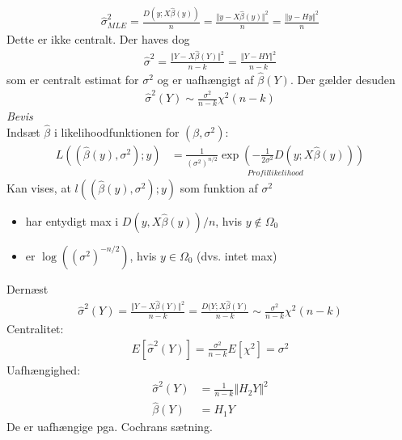 \documentclass[12pt,a4paper]{report}
\begin{document}
\begin{align*}
\hat{\sigma}^2_{MLE}=\frac{D(y;X\hat{\beta}(y))}{n}=\frac{\Vert y-X\hat{\beta}(y)\Vert^2}{n}=\frac{\Vert y-Hy\Vert^2}{n}
\end{align*}
Dette er ikke centralt. Der haves dog
\begin{align*}
\hat{\sigma}^2=\frac{\Vert Y-X\hat{\beta}(Y)\Vert^2}{n-k}=\frac{\Vert Y-HY\Vert^2}{n-k}
\end{align*}
som er centralt estimat for $\sigma^2$ og er uafhængigt af $\hat{\beta}(Y)$. Der gælder desuden
\begin{align*}
\hat{\sigma}^2(Y)\sim\frac{\sigma^2}{n-k}\chi^2(n-k)
\end{align*}
\textit{Bevis}\\
Indsæt $\hat{\beta}$ i likelihoodfunktionen for $(\beta,\sigma^2)$:
\begin{align*}
L((\hat{\beta}(y),\sigma^2);y)&=\underset{Profillikelihood}{\frac{1}{(\sigma^2)^{n/2}}\exp\left(-\frac{1}{2\sigma^2}D(y;X\hat{\beta}(y))\right)}
\end{align*}
Kan vises, at $l((\hat{\beta}(y),\sigma^2);y)$ som funktion af $\sigma^2$
\begin{itemize}
\item har entydigt max i $D(y,X\hat{\beta}(y))/n$, hvis $y\notin\Omega_0$
\item er $\log((\sigma^2)^{-n/2})$, hvis $y\in\Omega_0$ (dvs. intet max)
\end{itemize}
Dernæst
\begin{align*}
\hat{\sigma}^2(Y)=\frac{\Vert Y-X\hat{\beta}(Y)\Vert^2}{n-k}=\frac{D(Y;X\hat{\beta}(Y)}{n-k}\sim\frac{\sigma^2}{n-k}\chi^2(n-k)
\end{align*}
Centralitet:
\begin{align*}
E[\hat{\sigma}^2(Y)]=\frac{\sigma^2}{n-k}E[\chi^2]=\sigma^2
\end{align*}
Uafhængighed:
\begin{align*}
\hat{\sigma}^2(Y)&=\frac{1}{n-k}\Vert H_2Y\Vert^2\\
\hat{\beta}(Y)&=H_1Y
\end{align*}
De er uafhængige pga. Cochrans sætning.
\end{document}

